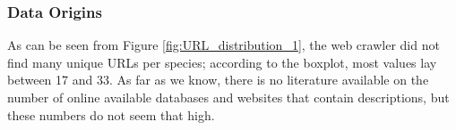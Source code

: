 \documentclass[a4paper, 12pt, oneside]{book} %
\begin{document}
\subsubsection{Data Origins}
As can be seen from Figure \ref{fig:URL_distribution_1}, the web crawler did not find many unique URLs per species; according to the boxplot, most values lay between 17 and 33.
As far as we know, there is no literature available on the number of online available databases and websites that contain descriptions, but these numbers do not seem that high.
\end{document}
